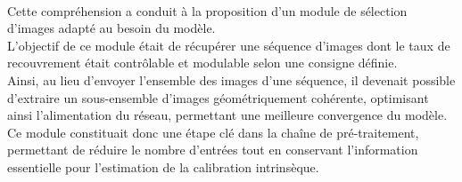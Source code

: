 \documentclass[12pt,a4paper,oneside]{report}
\begin{document}
\paragraph{} Cette compréhension a conduit à la proposition d'un module de sélection d'images adapté au besoin du modèle.\\
 L'objectif de ce module était de récupérer une séquence d'images dont le taux de recouvrement était contrôlable et modulable selon une consigne définie. \\
\hspace*{.3cm} Ainsi, au lieu d'envoyer l'ensemble des images d'une séquence, il devenait possible d'extraire un sous-ensemble d'images géométriquement cohérente, optimisant ainsi l'alimentation du réseau, permettant une meilleure convergence du modèle.\\
 Ce module constituait donc une étape clé dans la chaîne de pré-traitement, permettant de réduire le nombre d'entrées tout en conservant l'information essentielle pour l'estimation de la calibration intrinsèque.
\endgroup

\newpage
\end{document}
